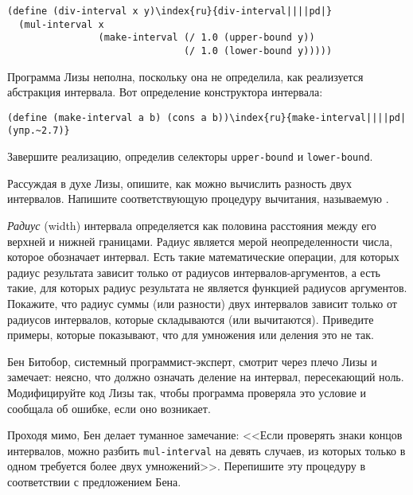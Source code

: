 \begin{Verbatim}[fontsize=\small]
(define (div-interval x y)\index{ru}{div-interval||||pd|}
  (mul-interval x 
                (make-interval (/ 1.0 (upper-bound y))
                               (/ 1.0 (lower-bound y)))))
\end{Verbatim}
\begin{exercise}{2.7}\label{EX2.7}%
Программа Лизы неполна, поскольку она не определила,
как реализуется абстракция интервала.  Вот определение конструктора
интервала:

\begin{Verbatim}[fontsize=\small]
(define (make-interval a b) (cons a b))\index{ru}{make-interval||||pd|(упр.~2.7)}
\end{Verbatim}
Завершите реализацию, определив селекторы {\tt upper-bound} 
и {\tt lower-bound}.
\end{exercise}
\begin{exercise}{2.8}\label{EX2.8}%
Рассуждая в духе Лизы, опишите, как можно вычислить
разность двух интервалов.  Напишите соответствующую процедуру
вычитания, называемую .
\end{exercise}
\begin{exercise}{2.9}\label{EX2.9}%
%
%
{\em Радиус} (width) интервала
определяется как половина расстояния между его верхней и нижней
границами.  Радиус является мерой неопределенности числа, которое
обозначает интервал.  Есть такие математические операции, для которых радиус
результата зависит только от радиусов интервалов-аргументов, а есть такие, 
для которых радиус результата не является функцией радиусов аргументов.
Покажите, что радиус суммы (или разности) двух интервалов зависит
только от радиусов интервалов, которые складываются (или вычитаются).
Приведите примеры, которые показывают, что для умножения или деления
это не так.
\end{exercise}
\begin{exercise}{2.10}\label{EX2.10}%
%
Бен Битобор, системный программист-эксперт, смотрит
через плечо Лизы и замечает: неясно, что должно означать деление 
на интервал, пересекающий ноль.  Модифицируйте код Лизы так, чтобы
программа проверяла это условие и сообщала об ошибке, если оно возникает.
\end{exercise}
\begin{exercise}{2.11}\label{EX2.11}%
Проходя мимо, Бен делает туманное замечание: <<Если
проверять знаки концов интервалов, можно разбить
{\tt mul-interval} 
на девять случаев, из которых только в одном 
требуется более двух умножений>>.  Перепишите эту процедуру в
соответствии с предложением Бена.
\end{exercise}

